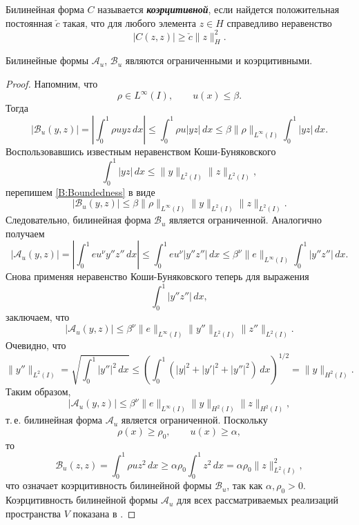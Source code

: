 %
%
%
\begin{definition}
Билинейная форма $C$ называется \emph{\textbf{коэрцитивной}},
если найдется положительная постоянная $\check{c}$
такая, что
для любого элемента $z \in H$ справедливо неравенство
\[
|C(z, z)|
\geq
\check{c} \lVert z \rVert_H^2.
\]
\end{definition}
%
%
%
\begin{proposition}
Билинейные формы $\mathcal{A}_u$, $\mathcal{B}_u$
являются ограниченными и коэрцитивными.
\end{proposition}
%
%
%
\begin{proof}
Напомним, что
\[
\rho \in L^\infty(I),
\qquad
u(x) \leq \beta.
\]
Тогда
\begin{equation}
\label{B:Boundedness}
|\mathcal{B}_u(y, z)|
=
\left|\int_0^1 \rho u y z \, dx
\right|
\leq
\int_0^1 \rho u |y z| \, dx
\leq
\beta
\lVert \rho \rVert_{L^\infty(I)}  \int_0^1 |y z| \, dx.
\end{equation}
Воспользовавшись известным неравенством Коши\nobreakdash-Буняковского
\cite{book:Kolmogorov,book:IP}
\[
\int_0^1 |y z| \, dx
\leq
\lVert y \rVert_{L^2(I)}
\lVert z \rVert_{L^2(I)},
\]
перепишем \eqref{B:Boundedness} в виде
\[
|\mathcal{B}_u(y, z)|
\leq
\beta
\lVert \rho \rVert_{L^\infty(I)}
\lVert y \rVert_{L^2(I)}
\lVert z \rVert_{L^2(I)}.
\]
Следовательно, билинейная форма $\mathcal{B}_u$ является ограниченной.
%
%
%
Аналогично получаем
\[
|\mathcal{A}_u(y, z)| = 
\left|
\int_0^1 eu^\nu y'' z'' \, dx
\right|
\leq
\int_0^1 eu^\nu |y'' z''| \, dx
\leq 
\beta^\nu
\lVert e \rVert_{L^\infty(I)}
\int_0^1 |y'' z''| \, dx.
\]
Снова применяя неравенство Коши\nobreakdash-Буняковского
теперь для выражения
\[
\int_0^1 |y'' z''| \, dx,
\]
заключаем,
что
\[
|\mathcal{A}_u(y, z)|
\leq
\beta^\nu
\lVert e \rVert_{L^\infty(I)}
\lVert y'' \rVert_{L^2(I)}
\lVert z'' \rVert_{L^2(I)}.
\]
Очевидно,
что
\[
\lVert y'' \rVert_{L^2(I)}
=
\sqrt{\int_0^1 |y''|^2 \, dx}
\leq
\left(\int_0^1 \left( |y|^2 + |y'|^2 + |y''|^2 \right) \, dx\right)^{1/2}
= \lVert y \rVert_{H^2(I)}.
\]
Таким образом,
\[
|\mathcal{A}_u(y, z)|
\leq
\beta^\nu
\lVert e \rVert_{L^\infty(I)}
\lVert y \rVert_{H^2(I)}
\lVert z \rVert_{H^2(I)},
\]
т.\,е.
билинейная форма
$\mathcal{A}_u$ является ограниченной.
%
%
%
Поскольку
\[
\rho(x) \geq \rho_0,
\qquad
u(x) \geq \alpha,
\]
то
\[
\mathcal{B}_u(z, z)
=
\int_0^1 \rho u z^2 \, dx
\geq
\alpha \rho_0
\int_0^1 z^2 \, dx
=
\alpha \rho_0 \lVert z \rVert_{L^2(I)}^2,
\]
что означает коэрцитивность билинейной формы $\mathcal{B}_u$,
так как
$\alpha, \rho_0 > 0$.
%
%
%
Коэрцитивность билинейной формы $\mathcal{A}_u$ для всех рассматриваемых реализаций пространства $V$
показана в
\cite{book:Fichera}.
\end{proof}
